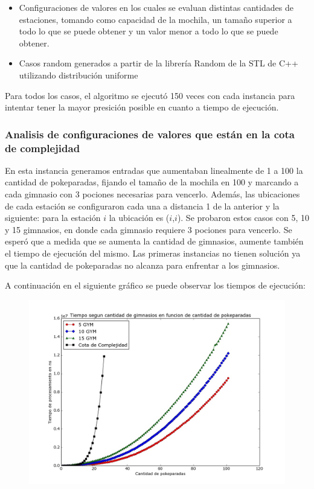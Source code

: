       \begin{itemize}
        \item Configuraciones de valores en los cuales se evaluan distintas cantidades de estaciones, tomando como capacidad de la mochila, un tamaño superior a todo lo que se puede obtener y un valor menor a todo lo que se puede obtener.
        \item Casos random generados a partir de la librería Random de la STL de C++ utilizando distribución uniforme
      \end{itemize}

      Para todos los casos, el algoritmo se ejecutó 150 veces con cada instancia para intentar tener la mayor presición posible en cuanto a tiempo de ejecución.

      \subsubsection{Analisis de configuraciones de valores que están en la cota de complejidad}
      En esta instancia generamos entradas que aumentaban linealmente de 1 a 100 la cantidad de pokeparadas, fijando el tamaño de la mochila en 100 y marcando a cada gimnasio con 3 pociones necesarias para vencerlo. Además, las ubicaciones de cada estación se configuraron cada una a distancia 1 de la anterior y la siguiente: para la estación $i$ la ubicación es ($i$,$i$).
      Se probaron estos casos con 5, 10 y 15 gimnasios, en donde cada gimnasio requiere 3 pociones para vencerlo. Se esperó que a medida que se aumenta la cantidad de gimnasios, aumente también el tiempo de ejecución del mismo. Las primeras instancias no tienen solución ya que la cantidad de pokeparadas no alcanza para enfrentar a los gimnasios.

      A continuación en el siguiente gráfico se puede observar los tiempos de ejecución:


      \begin{figure}[H]
      \begin{center}
        \includegraphics[width=1.0\columnwidth]{imagenes/exp1_ej2_nuevo.jpeg}
        \caption{}
      \end{center}
  \end{figure}

